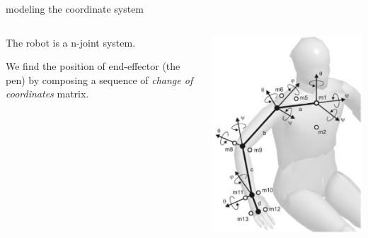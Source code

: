 \documentclass{beamer}
\begin{document}
\begin{frame}[allowframebreaks]{modeling the coordinate system}

\begin{columns}
\begin{column}{0.5\textwidth}
\justify
   The robot is a n-joint system. 
   
   We find the position of end-effector (the pen) by composing a sequence of \emph{change of coordinates} matrix.
\end{column}
\begin{column}{0.5\textwidth}  %
    \begin{center}
     \includegraphics[scale = 0.35]{arm.jpg}\cite{3}
     \end{center}
\end{column}
\end{columns}





\end{frame}
\end{document}

